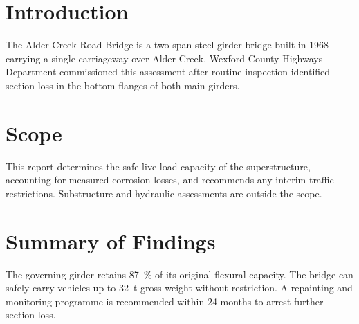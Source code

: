 \documentclass[11pt]{article}
\begin{document}
\section{Introduction}
The Alder Creek Road Bridge is a two-span steel girder bridge built in 1968
carrying a single carriageway over Alder Creek. Wexford County Highways
Department commissioned this assessment after routine inspection identified
section loss in the bottom flanges of both main girders.

\section{Scope}
This report determines the safe live-load capacity of the superstructure,
accounting for measured corrosion losses, and recommends any interim traffic
restrictions. Substructure and hydraulic assessments are outside the scope.

\section{Summary of Findings}
The governing girder retains \SI{87}{\percent} of its original flexural
capacity. The bridge can safely carry vehicles up to \SI{32}{\tonne} gross
weight without restriction. A repainting and monitoring programme is
recommended within 24 months to arrest further section loss.
\end{document}
